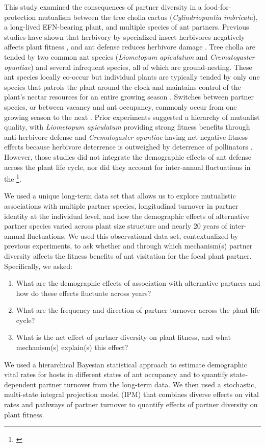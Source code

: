 \documentclass[11pt]{article}
\newcommand{\tom}[2]{{\color{red}{#1}}\footnote{\textit{\color{red}{#2}}}}
\begin{document}
This study examined the consequences of partner diversity in a food-for-protection mutualism between the tree cholla cactus (\textit{Cylindriopuntia imbricata}), a long-lived EFN-bearing plant, and multiple species of ant partners.
Previous studies have shown that herbivory by specialized insect herbivores negatively affects plant fitness \cite{Miller2009}, and ant defense reduces herbivore damage \cite{Miller2007}. 
Tree cholla are tended by two common ant species (\textit{Liometopum apiculatum} and \textit{Crematogaster opuntiae}) and several infrequent species, all of which are ground-nesting. 
These ant species locally co-occur but individual plants are typically tended by only one species that patrols the plant around-the-clock and maintains control of the plant's nectar resources for an entire growing season \citep{Ohm2014, Donald2022}. 
Switches between partner species, or between vacancy and ant occupancy, commonly occur from one growing season to the next \citep{Miller2007}. 
Prior experiments suggested a hierarchy of mutualist quality, with \textit{Liometopum apiculatum} providing strong fitness benefits through anti-herbivore defense and \textit{Crematogaster opuntiae} having net negative fitness effects because herbivore deterrence is outweighed by deterrence of pollinators \citep{Miller2007,Ohm2014}. 
However, those studies did not integrate the demographic effects of ant defense across the plant life cycle, nor did they account for inter-annual fluctuations in the \tom{herbivore populations}{I would be careful here -- unless you are using the herbivore counts I don't think you have data on this.}.

We used a unique long-term data set that allows us to explore mutualistic associations with multiple partner species, longitudinal turnover in partner identity at the individual level, and how the demographic effects of alternative partner species varied across plant size structure and nearly 20 years of inter-annual fluctuations. 
We used this observational data set, contextualized by previous experiments, to ask whether and through which mechanism(s) partner diversity affects the fitness benefits of ant visitation for the focal plant partner. 
Specifically, we asked:
	\begin{enumerate}	
		\item{What are the demographic effects of association with alternative partners and how do these effects fluctuate across years?}
		\item{What are the frequency and direction of partner turnover across the plant life cycle?}	
		\item{What is the net effect of partner diversity on plant fitness, and what mechanism(s) explain(s) this effect?}
	\end{enumerate}
We used a hierarchical Bayesian statistical approach to estimate demographic vital rates for hosts in different states of ant occupancy and to quantify state-dependent partner turnover from the long-term data. 
We then used a stochastic, multi-state integral projection model (IPM) that combines diverse effects on vital rates and pathways of partner turnover to quantify effects of partner diversity on plant fitness. 
\end{document}
